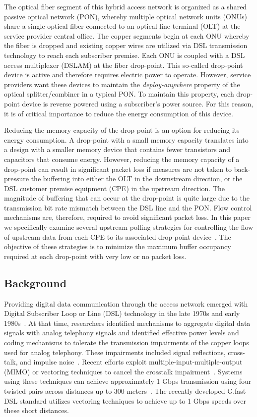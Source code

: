 \documentclass[pdftex,journal]{IEEEtran}
\begin{document}
The optical fiber segment of this hybrid access network is organized as a
shared passive optical network (PON), whereby multiple optical network
units (ONUs)
share a single optical fiber connected to an optical line terminal (OLT) at the
service provider central office. The copper segments begin at each ONU whereby
the fiber is dropped and existing copper wires are utilized via DSL
transmission
technology to reach each subscriber premise. Each ONU is coupled with a DSL
access multiplexer (DSLAM) at the fiber drop-point. This so-called drop-point
device is active and therefore requires electric power to operate. However,
service providers want these devices to maintain the \textit{deploy-anywhere}
property of the optical splitter/combiner in a typical PON. To maintain this
property, each drop-point device is reverse powered using a subscriber's power
source. For this reason, it is of critical importance to reduce the energy
consumption of this device.

Reducing the memory capacity of the drop-point is an option for reducing
its energy consumption. A drop-point with a small memory capacity
translates into a design with a smaller memory device that contains
fewer transistors and capacitors that consume energy. However, reducing
the memory capacity of a drop-point can result in significant packet loss
if measures are not taken to back-pressure the buffering into either the
OLT in the downstream direction, or the DSL customer premise equipment (CPE) in
the upstream direction. The magnitude of buffering that can occur at the
drop-point is quite large due to the transmission bit rate mismatch between
the DSL line and the PON. Flow control mechanisms are, therefore, required to
avoid significant packet loss. In this paper we specifically examine several
upstream polling strategies for controlling the flow of upstream data from
each CPE to its associated drop-point device~\cite{L0313}. The objective of
these strategies is to minimize the maximum buffer occupancy required at
each drop-point with very low or no packet loss.

\subsection{Background}
Providing digital data communication through the access network
emerged with Digital Subscriber Loop or Line (DSL) technology in the
late 1970s and early 1980s~\cite{ABG1181}. At that time, researchers
identified mechanisms to aggregate digital data signals with analog
telephony signals and identified effective power levels and coding
mechanisms to tolerate the transmission impairments of the copper
loops used for analog telephony. These impairments included signal
reflections, cross-talk, and impulse noise~\cite{ABG1181}.  Recent
efforts exploit multiple-input-multiple-output (MIMO) or vectoring
techniques to cancel the crosstalk
impairment~\cite{GC0602,LCJM0907}. Systems using these techniques can
achieve approximately 1 Gbps transmission using four twisted pairs
across distances up to 300 meters~\cite{LCJM0907}. The recently
developed G.fast~\cite{Gfast,TGNM0813} DSL standard utilizes vectoring
techniques to achieve up to 1 Gbps speeds over these short distances.
\end{document}
